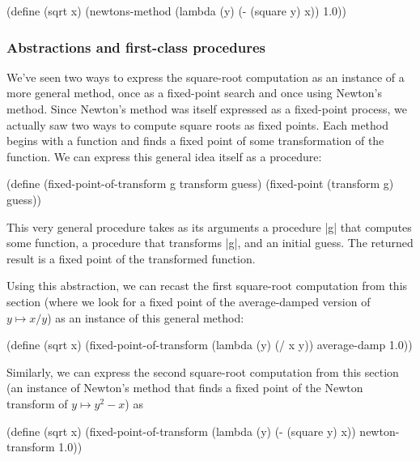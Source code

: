 \begin{schemedisplay}
(define (sqrt x)
  (newtons-method (lambda (y) (- (square y) x))
                  1.0))
\end{schemedisplay}

\subsubsection*{Abstractions and first-class procedures}

We've seen two ways to express the square-root
computation as an instance of a more general method, once as a fixed-point
search and once using Newton's method.  Since Newton's method
was itself expressed as a fixed-point process,
we actually saw two ways to compute square roots as fixed points.
Each method begins with a function and finds a fixed
point of some transformation of the function.  We can express this
general idea itself as a procedure:

\begin{schemedisplay}
(define (fixed-point-of-transform g transform guess)
  (fixed-point (transform g) guess))
\end{schemedisplay}

This very general procedure takes as its arguments a procedure
\scheme|g| that computes some function, a procedure that transforms
\scheme|g|, and an initial guess.  The returned result is a fixed
point of the transformed function.

Using this abstraction, we can recast the first square-root
computation from this section (where we look for a fixed point of the
average-damped version of $y \mapsto x/y$) as an instance of this
general method:

\begin{schemedisplay}
(define (sqrt x)
  (fixed-point-of-transform (lambda (y) (/ x y))
                            average-damp
                            1.0))
\end{schemedisplay}

Similarly, we can express the second square-root computation from this
section (an instance of Newton's method that finds a fixed point of
the Newton transform of $y \mapsto y^2 - x$) as

\begin{schemedisplay}
(define (sqrt x)
  (fixed-point-of-transform (lambda (y) (- (square y) x))
                            newton-transform
                            1.0))
\end{schemedisplay}

